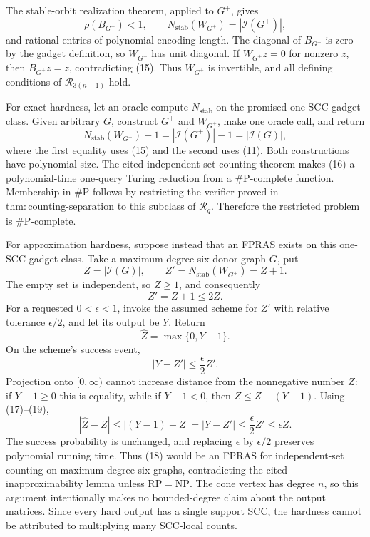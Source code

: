 The stable-orbit realization theorem, applied to \(G^+\), gives
\[
 \rho(B_{G^+})<1,
 \qquad
 N_{\mathrm{stab}}(W_{G^+})
 =|\mathcal I(G^+)|, \tag{15}
\]
and rational entries of polynomial encoding length. The diagonal of \(B_{G^+}\) is zero by the gadget definition, so \(W_{G^+}\) has unit diagonal. If \(W_{G^+}z=0\) for nonzero \(z\), then \(B_{G^+}z=z\), contradicting (15). Thus \(W_{G^+}\) is invertible, and all defining conditions of \(\mathcal R_{3(n+1)}\) hold.

For exact hardness, let an oracle compute \(N_{\mathrm{stab}}\) on the promised one-SCC gadget class. Given arbitrary \(G\), construct \(G^+\) and \(W_{G^+}\), make one oracle call, and return
\[
 N_{\mathrm{stab}}(W_{G^+})-1
 =|\mathcal I(G^+)|-1
 =|\mathcal I(G)|, \tag{16}
\]
where the first equality uses (15) and the second uses (11). Both constructions have polynomial size. The cited independent-set counting theorem makes (16) a polynomial-time one-query Turing reduction from a \(\#\mathrm P\)-complete function. Membership in \(\#\mathrm P\) follows by restricting the verifier proved in \(\mathrm{thm:counting\mbox{-}separation}\) to this subclass of \(\mathcal R_q\). Therefore the restricted problem is \(\#\mathrm P\)-complete.

For approximation hardness, suppose instead that an FPRAS exists on this one-SCC gadget class. Take a maximum-degree-six donor graph \(G\), put
\[
 Z=|\mathcal I(G)|,
 \qquad
 Z'=N_{\mathrm{stab}}(W_{G^+})=Z+1.
\]
The empty set is independent, so \(Z\geq1\), and consequently
\[
 Z'=Z+1\leq2Z. \tag{17}
\]
For a requested \(0<\epsilon<1\), invoke the assumed scheme for \(Z'\) with relative tolerance \(\epsilon/2\), and let its output be \(Y\). Return
\[
 \widehat Z=\max\{0,Y-1\}. \tag{18}
\]
On the scheme's success event,
\[
 |Y-Z'|\leq\frac{\epsilon}{2}Z'. \tag{19}
\]
Projection onto \([0,\infty)\) cannot increase distance from the nonnegative number \(Z\): if \(Y-1\geq0\) this is equality, while if \(Y-1<0\), then \(Z\leq Z-(Y-1)\). Using (17)--(19),
\[
 |\widehat Z-Z|
 \leq |(Y-1)-Z|
 =|Y-Z'|
 \leq\frac{\epsilon}{2}Z'
 \leq\epsilon Z. \tag{20}
\]
The success probability is unchanged, and replacing \(\epsilon\) by \(\epsilon/2\) preserves polynomial running time. Thus (18) would be an FPRAS for independent-set counting on maximum-degree-six graphs, contradicting the cited inapproximability lemma unless \(\mathrm{RP}=\mathrm{NP}\). The cone vertex has degree \(n\), so this argument intentionally makes no bounded-degree claim about the output matrices. Since every hard output has a single support SCC, the hardness cannot be attributed to multiplying many SCC-local counts.
